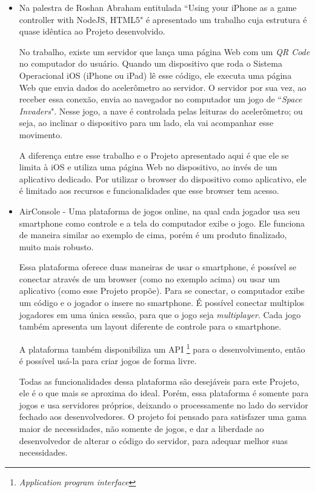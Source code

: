 \documentclass[a4paper,12pt]{article}
\begin{document}
\begin{itemize}

    \item Na palestra de Roshan Abraham entitulada “Using your iPhone as a game controller with NodeJS, HTML5" é apresentado um trabalho cuja estrutura é quase idêntica ao Projeto desenvolvido.

    No trabalho, existe um servidor que lança uma página Web com um \emph{QR Code} no computador do usuário. Quando um dispositivo que roda o Sistema Operacional iOS (iPhone ou iPad) lê esse código, ele executa uma página Web que envia dados do acelerômetro ao servidor. O servidor por sua vez, ao receber essa conexão, envia ao navegador no computador um jogo de “\emph{Space Invaders}". Nesse jogo, a nave é controlada pelas leituras do acelerômetro; ou seja, ao inclinar o dispositivo para um lado, ela vai acompanhar esse movimento.

    A diferença entre esse trabalho e o Projeto apresentado aqui é que ele se limita à iOS e utiliza uma página Web no dispositivo, ao invés de um aplicativo dedicado. Por utilizar o browser do dispositivo como aplicativo, ele é limitado aos recursos e funcionalidades que esse browser tem acesso.

    \item AirConsole - Uma plataforma de jogos online, na qual cada jogador usa seu smartphone como controle e a tela do computador exibe o jogo. Ele funciona de maneira similar ao exemplo de cima, porém é um produto finalizado, muito mais robusto.

    Essa plataforma oferece duas maneiras de usar o smartphone, é possível se conectar através de um browser (como no exemplo acima) ou usar um aplicativo (como esse Projeto propõe). Para se conectar, o computador exibe um código e o jogador o insere no smartphone. É possível conectar multiplos jogadores em uma única sessão, para que o jogo seja \emph{multiplayer}. Cada jogo também apresenta um layout diferente de controle para o smartphone.

    A plataforma também disponibiliza um API \footnote{\emph{Application program interface}} para o desenvolvimento, então é possível usá-la para criar jogos de forma livre.

    Todas as funcionalidades dessa plataforma são desejáveis para este Projeto, ele é o que mais se aproxima do ideal. Porém, essa plataforma é somente para jogos e usa servidores próprios, deixando o processamente no lado do servidor fechado aos desenvolvedores. O projeto foi pensado para satisfazer uma gama maior de necessidades, não somente de jogos, e dar a liberdade ao desenvolvedor de alterar o código do servidor, para adequar melhor suas necessidades.

\end{itemize}
\end{document}
